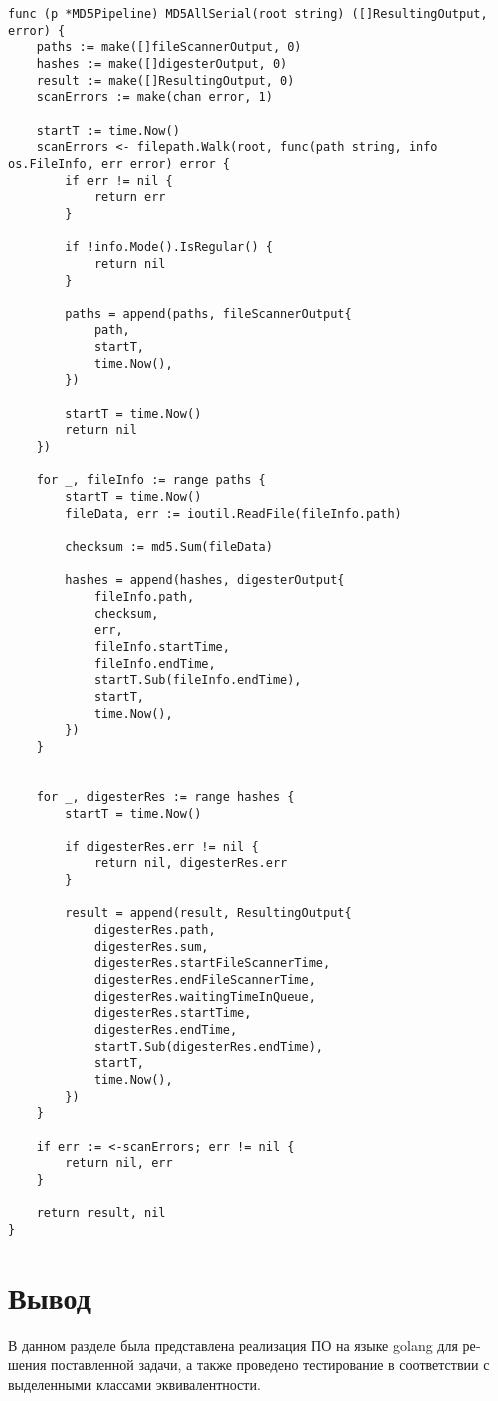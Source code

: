 \begin{lstlisting}[label=lst:serial,caption={Последовательная версия программы}]
func (p *MD5Pipeline) MD5AllSerial(root string) ([]ResultingOutput, error) {
	paths := make([]fileScannerOutput, 0)
	hashes := make([]digesterOutput, 0)
	result := make([]ResultingOutput, 0)
	scanErrors := make(chan error, 1)

	startT := time.Now()
	scanErrors <- filepath.Walk(root, func(path string, info os.FileInfo, err error) error {
		if err != nil {
			return err
		}

		if !info.Mode().IsRegular() {
			return nil
		}

		paths = append(paths, fileScannerOutput{
			path,
			startT,
			time.Now(),
		})

		startT = time.Now()
		return nil
	})

	for _, fileInfo := range paths {
		startT = time.Now()
		fileData, err := ioutil.ReadFile(fileInfo.path)

		checksum := md5.Sum(fileData)

		hashes = append(hashes, digesterOutput{
			fileInfo.path,
			checksum,
			err,
			fileInfo.startTime,
			fileInfo.endTime,
			startT.Sub(fileInfo.endTime),
			startT,
			time.Now(),
		})
	}


	for _, digesterRes := range hashes {
		startT = time.Now()

		if digesterRes.err != nil {
			return nil, digesterRes.err
		}

		result = append(result, ResultingOutput{
			digesterRes.path,
			digesterRes.sum,
			digesterRes.startFileScannerTime,
			digesterRes.endFileScannerTime,
			digesterRes.waitingTimeInQueue,
			digesterRes.startTime,
			digesterRes.endTime,
			startT.Sub(digesterRes.endTime),
			startT,
			time.Now(),
		})
	}

	if err := <-scanErrors; err != nil {
		return nil, err
	}

	return result, nil
}
\end{lstlisting}


\section{Вывод}
В данном разделе была представлена реализация ПО на языке golang для ре­
шения поставленной задачи, а также проведено тестирование в соответствии 
с выделенными классами эквивалентности.